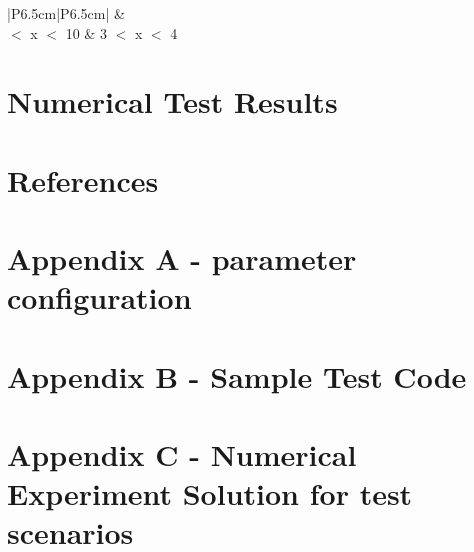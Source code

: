 \documentclass[11pt,letterpaper]{article}
\begin{document}
\begin{table}[H]
	\centering
	\caption{Test B-dep-1 Base Test Acceptance}
	\label{tab:testa5base}
	\begin{tabular}{|P{6.5cm}|P{6.5cm}|}
		\hline
		\textbf{} &\textbf{}\\
		 $<$ x $<$ 10 & 3 $<$ x $<$ 4\\
		\hline
	\end{tabular}
\end{table}



\section{Numerical Test Results}


\section{References}


\section*{Appendix A - parameter configuration}

\section*{Appendix B - Sample Test Code }

\section*{Appendix C - Numerical Experiment Solution for test scenarios}
\end{document}
